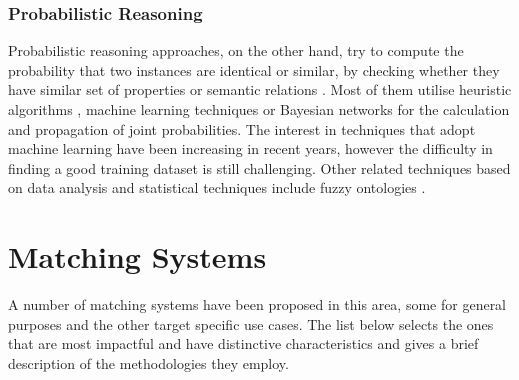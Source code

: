 \subsubsection{Probabilistic Reasoning}

Probabilistic reasoning approaches, on the other hand, try to compute the probability that two instances are identical or similar, by checking whether they have similar set of properties or semantic relations \cite{DBLP:conf/esws/CastanoFLNM08}. Most of them utilise heuristic algorithms \cite{DBLP:conf/jist/NguyenI15}, machine learning techniques or Bayesian networks \cite{DBLP:conf/semweb/SvabS06} for the calculation and propagation of joint probabilities. The interest in techniques that adopt machine learning have been increasing in recent years, however the difficulty in finding a good training dataset is still challenging. Other related techniques based on data analysis and statistical techniques include fuzzy ontologies \cite{DBLP:conf/semweb/TodorovHG13}.


\section{Matching Systems}

A number of matching systems have been proposed in this area, some for general purposes and the other target specific use cases. The list below selects the ones that are most impactful and have distinctive characteristics and gives a brief description of the methodologies they employ.

